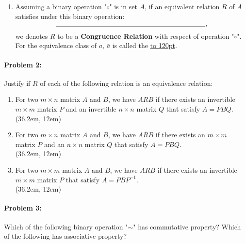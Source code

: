 \documentclass[12pt]{scrartcl}
\begin{document}
{{\begin{enumerate}[label=(\alph*)]
	\item Assuming a binary operation "$\circ$" is in set $A$, if an equivalent relation $R$ of $A$ satisfies under this binary operation: $$\underline{\hbox to 220pt{}},$$ we denotes $R$ to be a \textbf{Congruence Relation} with respect of operation "$\circ$". For the equivalence class of $a$, $\bar{a}$ is called the \underline{\hbox to 120pt{}}. 

	\end{enumerate}

\newpage

\paragraph*{Problem 2: } Justify if $R$ of each of the following relation is an equivalence relation:

	\begin{enumerate}[label=\arabic*)]
	
	\item For two $m \times n$ matrix $A$ and $B$, we have $ARB$ if there exists an invertible $m \times m$ matrix $P$ and an invertible $n \times n$ matrix $Q$ that satisfy $A=PBQ$.\\

	\framebox(36.2em, 12em){}\\

	\item For two $m \times n$ matrix $A$ and $B$, we have $ARB$ if there exists an $m \times m$ matrix $P$ and an $n \times n$ matrix $Q$ that satisfy $A=PBQ$.\\

	\framebox(36.2em, 12em){}\\

	\item For two $m \times m$ matrix $A$ and $B$, we have $ARB$ if there exists an invertible $m \times m$ matrix $P$ that satisfy $A=PBP^{-1}$.\\

	\framebox(36.2em, 12em){}

	\end{enumerate}

\newpage

\paragraph*{Problem 3: } Which of the following binary operation "$\sim$" has commutative property? Which of the following has associative property?

}}
\end{document}
